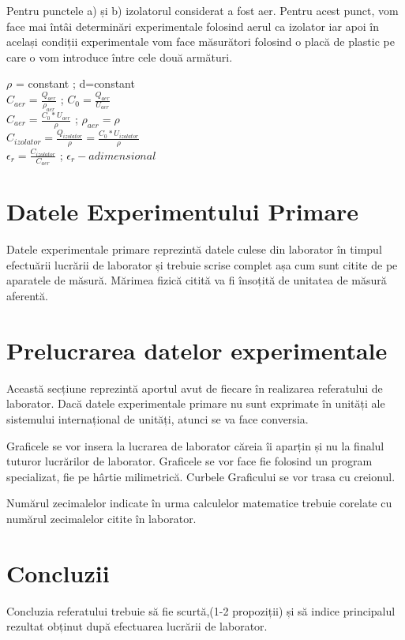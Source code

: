 \documentclass[12pt]{article}
\begin{document}
Pentru punctele a) și b) izolatorul considerat a fost aer. Pentru acest punct, vom face mai întâi determinări experimentale folosind aerul
ca izolator iar apoi în același condiții experimentale vom face măsurători folosind o placă de plastic pe care o vom introduce între cele două armături.

$\rho$ = constant ; d=constant \\

$C_{aer}=\frac{Q_{aer}}{\rho_{aer}}$  ;  $C_{0}=\frac{Q_{aer}}{U_{aer}}$\\

$C_{aer}=\frac{C_{0}*U_{aer}}{\rho}$  ; $\rho_{aer}=\rho$\\

$C_{izolator}=\frac{Q_{izolator}}{\rho}=\frac{C_{0}*U_{izolator}}{\rho}$\\

$\epsilon_{r}=\frac{C_{izolator}}{C_{aer}}$  ;  $\epsilon_{r}-adimensional$\\



\section{Datele Experimentului Primare}
Datele experimentale primare reprezintă datele culese din laborator în timpul efectuării lucrării de laborator și trebuie scrise complet așa
cum sunt citite de pe aparatele de măsură. Mărimea fizică citită va fi însoțită de unitatea de măsură aferentă.


\section{Prelucrarea datelor experimentale}
Această secțiune reprezintă aportul avut de fiecare în realizarea referatului de laborator. Dacă datele experimentale primare nu sunt exprimate
în unități ale sistemului internațional de unități, atunci se va face conversia.

Graficele se vor insera la lucrarea de laborator căreia îi aparțin și nu la finalul tuturor lucrărilor de laborator. Graficele se vor face fie folosind
un program specializat, fie pe hârtie milimetrică. Curbele Graficului se vor trasa cu creionul.


Numărul zecimalelor indicate în urma calculelor matematice trebuie corelate cu numărul zecimalelor citite în laborator.


\section{Concluzii}
Concluzia referatului trebuie să fie scurtă,(1-2 propoziții) și să indice principalul rezultat obținut după efectuarea lucrării de laborator.
\end{document}
